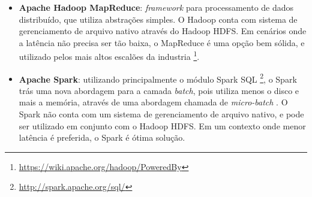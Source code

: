 \begin{itemize}
    \item \textbf{Apache Hadoop MapReduce}: \textit{framework} para processamento
de dados distribuído, que utiliza abstrações simples. O Hadoop conta com sistema
de gerenciamento de arquivo nativo através do Hadoop HDFS. Em cenários onde a
latência não precisa ser tão baixa, o MapReduce é uma opção bem sólida, e
utilizado pelos mais altos escalões da
industria \footnote{\url{https://wiki.apache.org/hadoop/PoweredBy}}.

    \item \textbf{Apache Spark}: utilizando principalmente o módulo Spark SQL
\footnote{\url{http://spark.apache.org/sql/}}, o Spark trás uma nova abordagem
para a camada \textit{batch}, pois utiliza menos o disco e mais a memória,
através de uma abordagem chamada de \textit{micro-batch} \cite{arsalan2014}.
O Spark não conta com um sistema de gerenciamento de arquivo nativo, e pode
ser utilizado em conjunto com o Hadoop HDFS. Em um contexto onde menor latência
é preferida, o Spark é ótima solução.

\end{itemize}

